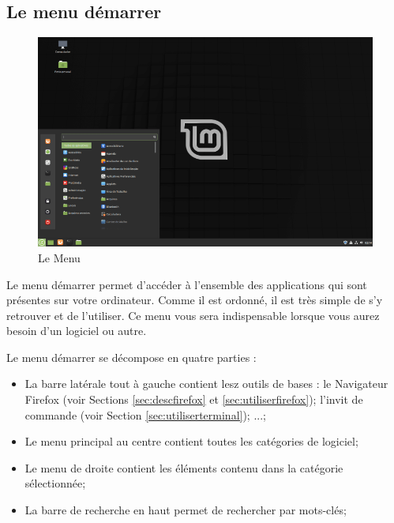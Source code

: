\documentclass[12pt]{book}
\begin{document}
	\subsection{Le menu démarrer}\label{sec:menu}
		\begin{figure}[h]
			\centering
			\includegraphics[width=\textwidth]{include/menu.png}\newline
			\caption{Le Menu}
			\label{fig:menu}
		\end{figure}\par
		Le menu démarrer permet d'accéder à l'ensemble des applications qui sont présentes sur votre ordinateur.
		Comme il est ordonné, il est très simple de s'y retrouver et de l'utiliser.
		Ce menu vous sera indispensable lorsque vous aurez besoin d'un logiciel ou autre.\par
		Le menu démarrer se décompose en quatre parties :
		\begin{itemize}
			\item La barre latérale tout à gauche contient lesz outils de bases : le Navigateur Firefox (voir Sections \ref{sec:descfirefox} et \ref{sec:utiliserfirefox}); l'invit de commande (voir Section \ref{sec:utiliserterminal}); ...;
			\item Le menu principal au centre contient toutes les catégories de logiciel;
			\item Le menu de droite contient les éléments contenu dans la catégorie sélectionnée;
			\item La barre de recherche en haut permet de rechercher par mots-clés;
		\end{itemize}
\end{document}
